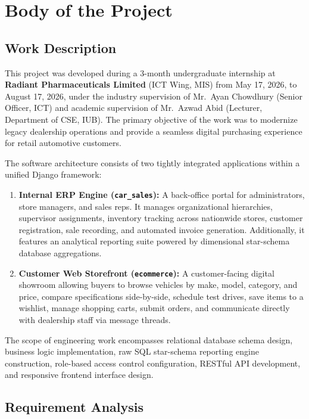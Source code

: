 \chapter{Body of the Project}

\section{Work Description}
This project was developed during a 3-month undergraduate internship at \textbf{Radiant Pharmaceuticals Limited} (ICT Wing, MIS) from May 17, 2026, to August 17, 2026, under the industry supervision of Mr.~Ayan Chowdhury (Senior Officer, ICT) and academic supervision of Mr.~Azwad Abid (Lecturer, Department of CSE, IUB). The primary objective of the work was to modernize legacy dealership operations and provide a seamless digital purchasing experience for retail automotive customers.

The software architecture consists of two tightly integrated applications within a unified Django framework:
\begin{enumerate}
    \item \textbf{Internal ERP Engine (\texttt{car\_sales}):} A back-office portal for administrators, store managers, and sales reps. It manages organizational hierarchies, supervisor assignments, inventory tracking across nationwide stores, customer registration, sale recording, and automated invoice generation. Additionally, it features an analytical reporting suite powered by dimensional star-schema database aggregations.
    \item \textbf{Customer Web Storefront (\texttt{ecommerce}):} A customer-facing digital showroom allowing buyers to browse vehicles by make, model, category, and price, compare specifications side-by-side, schedule test drives, save items to a wishlist, manage shopping carts, submit orders, and communicate directly with dealership staff via message threads.
\end{enumerate}

The scope of engineering work encompasses relational database schema design, business logic implementation, raw SQL star-schema reporting engine construction, role-based access control configuration, RESTful API development, and responsive frontend interface design.

\clearpage
\section{Requirement Analysis}


